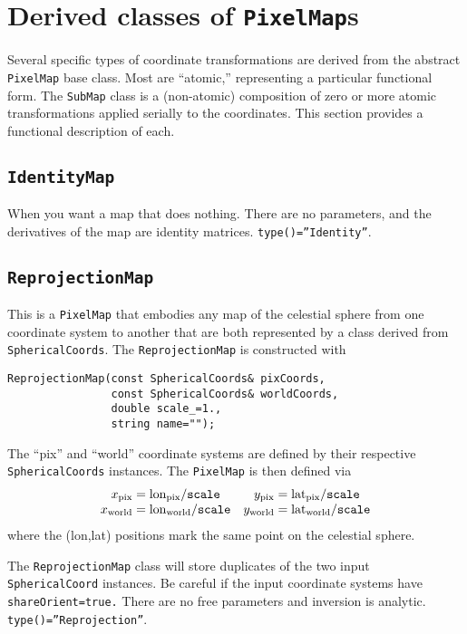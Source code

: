 \documentclass[11pt,preprint,flushrt]{aastex}
\begin{document}
\section{Derived classes of {\tt PixelMap}s}
Several specific types of coordinate transformations are derived from the abstract \texttt{PixelMap} base class.  
Most are ``atomic,'' representing a particular functional form.  The \texttt{SubMap} class is a (non-atomic) composition of zero or more atomic transformations applied serially to the coordinates.  This section provides a functional description of each.

\subsection{{\tt IdentityMap}}
When you want a map that does nothing.  There are no parameters, and the derivatives of the map are identity matrices.  {\tt type()=''Identity''}.

\subsection{{\tt ReprojectionMap}}
This is a {\tt PixelMap} that embodies any map of the celestial sphere from one coordinate system to another that are both represented by a class derived from {\tt SphericalCoords}.  The {\tt ReprojectionMap} is constructed with
\begin{verbatim}
ReprojectionMap(const SphericalCoords& pixCoords,
                const SphericalCoords& worldCoords,
                double scale_=1.,
                string name="");
\end{verbatim}
The ``pix'' and ``world'' coordinate systems are defined by their respective {\tt SphericalCoords} instances.  The {\tt PixelMap} is then defined via
\begin{equation}
\begin{array}{cc}
x_{\rm pix} = {\rm lon}_{\rm pix}/{\tt scale} & y_{\rm pix} = {\rm lat}_{\rm pix}/{\tt scale}  \\
x_{\rm world} = {\rm lon}_{\rm world}/{\tt scale} & y_{\rm world} = {\rm lat}_{\rm world}/{\tt scale} 
\end{array}
\end{equation}
where the (lon,lat) positions mark the same point on the celestial sphere.  

The {\tt ReprojectionMap} class will store duplicates of the two input {\tt SphericalCoord} instances.  Be careful if the input coordinate systems have {\tt shareOrient=true.}  There are no free parameters and inversion is analytic.
\texttt{type()=''Reprojection''}.
\end{document}
